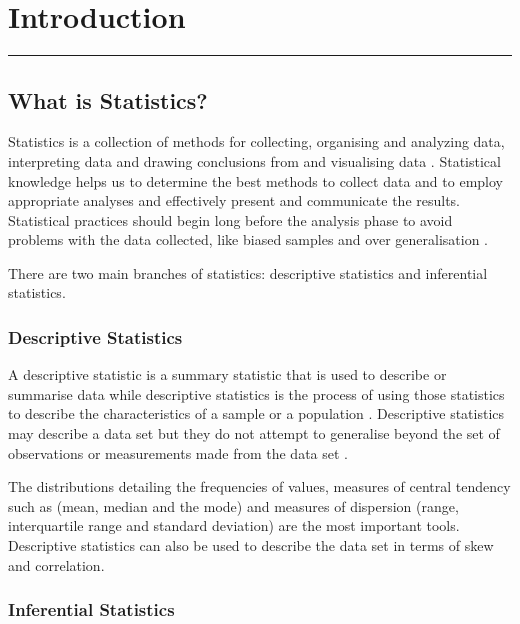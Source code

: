 \documentclass[
]{book}
\begin{document}
\hypertarget{intro}{%
\chapter{Introduction}\label{intro}}

\begin{center}\rule{0.5\linewidth}{0.5pt}\end{center}

\hypertarget{what-is-statistics}{%
\section{What is Statistics?}\label{what-is-statistics}}

Statistics is a collection of methods for collecting, organising and analyzing data, interpreting data and drawing conclusions from and visualising data \citep{Witte2017}. Statistical knowledge helps us to determine the best methods to collect data and to employ appropriate analyses and effectively present and communicate the results. Statistical practices should begin long before the analysis phase to avoid problems with the data collected, like biased samples and over generalisation \citep{Frost2019}.

There are two main branches of statistics: descriptive statistics and inferential statistics.

\hypertarget{descriptive-statistics}{%
\subsection{Descriptive Statistics}\label{descriptive-statistics}}

A descriptive statistic is a summary statistic that is used to describe or summarise data while descriptive statistics is the process of using those statistics to describe the characteristics of a sample or a population \citep{Witte2017}. Descriptive statistics may describe a data set but they do not attempt to generalise beyond the set of observations or measurements made from the data set \citep{Frost2019}.

The distributions detailing the frequencies of values, measures of central tendency such as (mean, median and the mode) and measures of dispersion (range, interquartile range and standard deviation) are the most important tools. Descriptive statistics can also be used to describe the data set in terms of skew and correlation.

\hypertarget{inferential-statistics}{%
\subsection{Inferential Statistics}\label{inferential-statistics}}
\end{document}
